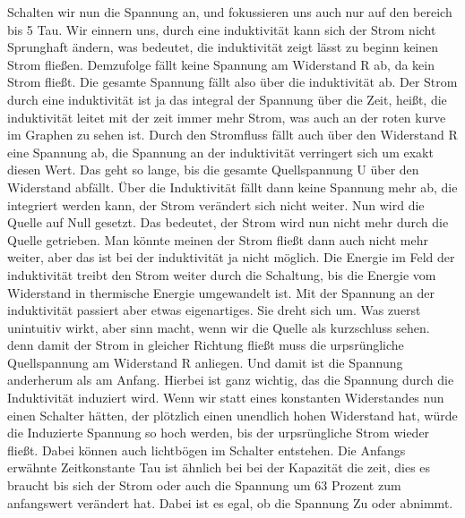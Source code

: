 \begin{frame}
{	}
	{Schalten wir nun die Spannung an, und fokussieren uns auch nur auf den bereich bis 5 Tau.
	Wir einnern uns, durch eine induktivität kann sich der Strom nicht Sprunghaft ändern, was bedeutet, die induktivität zeigt lässt zu beginn keinen Strom fließen. Demzufolge fällt keine Spannung am Widerstand R ab, da kein Strom fließt. Die gesamte Spannung fällt also über die induktivität ab.
	Der Strom durch eine induktivität ist ja das integral der Spannung über die Zeit, heißt, die induktivität leitet mit der zeit immer mehr Strom, was auch an der roten kurve im Graphen zu sehen ist.
	Durch den Stromfluss fällt auch über den Widerstand R eine Spannung ab, die Spannung an der induktivität verringert sich um exakt diesen Wert. Das geht so lange, bis die gesamte Quellspannung U über den Widerstand abfällt. Über die Induktivität fällt dann keine Spannung mehr ab, die integriert werden kann, der Strom verändert sich nicht weiter.
	}
	{Nun wird die Quelle auf Null gesetzt.
	Das bedeutet, der Strom wird nun nicht mehr durch die Quelle getrieben. Man könnte meinen der Strom fließt dann auch nicht mehr weiter, aber das ist bei der induktivität ja nicht möglich. Die Energie im Feld der induktivität treibt den Strom weiter durch die Schaltung, bis die Energie vom Widerstand in thermische Energie umgewandelt ist.
	}
	{Mit der Spannung an der induktivität passiert aber etwas eigenartiges. Sie dreht sich um. Was zuerst unintuitiv wirkt, aber sinn macht, wenn wir die Quelle als kurzschluss sehen. denn damit der Strom in gleicher Richtung fließt muss die urpsrüngliche Quellspannung am Widerstand R anliegen. Und damit ist die Spannung anderherum als am Anfang.
	Hierbei ist ganz wichtig, das die Spannung durch die Induktivität induziert wird. Wenn wir statt eines konstanten Widerstandes nun einen Schalter hätten, der plötzlich einen unendlich hohen Widerstand hat, würde die Induzierte Spannung so hoch werden, bis der urpsrüngliche Strom wieder fließt. Dabei können auch lichtbögen im Schalter entstehen.
	}
	{Die Anfangs erwähnte Zeitkonstante Tau ist ähnlich bei bei der Kapazität die zeit, dies es braucht bis sich der Strom oder auch die Spannung um 63 Prozent zum anfangswert verändert hat. Dabei ist es egal, ob die Spannung Zu oder abnimmt.}
\end{frame}
